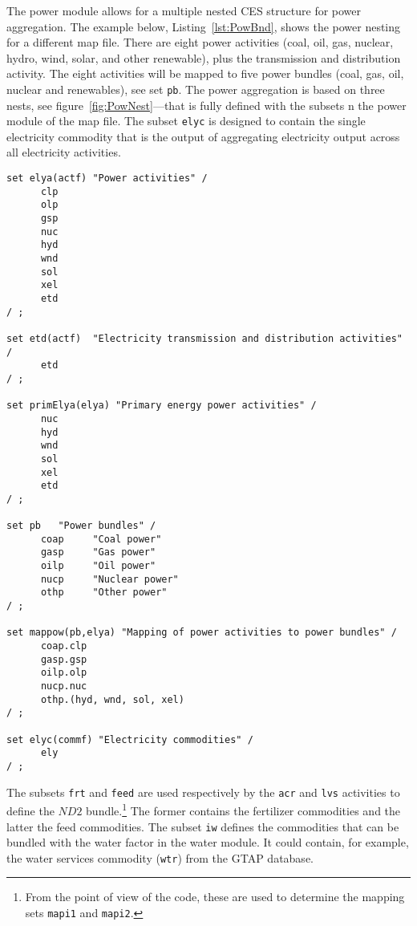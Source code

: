 The power module allows for a multiple nested CES structure for power
aggregation. The example below, Listing~\ref{lst:PowBnd}, shows the power
nesting for a different map file. There are eight power activities (coal, oil,
gas, nuclear, hydro, wind, solar, and other renewable), plus the transmission
and distribution activity. The eight activities will be mapped to five power
bundles (coal, gas, oil, nuclear and renewables), see set \texttt{pb}. The power
aggregation is based on three nests, see figure~\ref{fig:PowNest}---that is
fully defined with the subsets n the power module of the map file. The subset
\texttt{elyc} is designed to contain the single electricity commodity that is
the output of aggregating electricity output across all electricity activities.

\begin{lstlisting}[language=GAMS, caption={A power bundle example}, label=lst:PowBnd]
set elya(actf) "Power activities" /
      clp
      olp
      gsp
      nuc
      hyd
      wnd
      sol
      xel
      etd
/ ;

set etd(actf)  "Electricity transmission and distribution activities" /
      etd
/ ;

set primElya(elya) "Primary energy power activities" /
      nuc
      hyd
      wnd
      sol
      xel
      etd
/ ;

set pb   "Power bundles" /
      coap     "Coal power"
      gasp     "Gas power"
      oilp     "Oil power"
      nucp     "Nuclear power"
      othp     "Other power"
/ ;

set mappow(pb,elya) "Mapping of power activities to power bundles" /
      coap.clp
      gasp.gsp
      oilp.olp
      nucp.nuc
      othp.(hyd, wnd, sol, xel)
/ ;

set elyc(commf) "Electricity commodities" /
      ely
/ ;

\end{lstlisting}

The subsets \texttt{frt} and \texttt{feed} are used respectively by the
\texttt{acr} and \texttt{lvs} activities to define the $\mathit{ND2}$
bundle.\footnote{From the point of view of the code, these are used to determine
the mapping sets \texttt{mapi1} and \texttt{mapi2}.} The former contains the
fertilizer commodities and the latter the feed commodities. The subset
\texttt{iw} defines the commodities that can be bundled with the water factor in
the water module. It could contain, for example, the water services commodity
(\texttt{wtr}) from the GTAP database.


